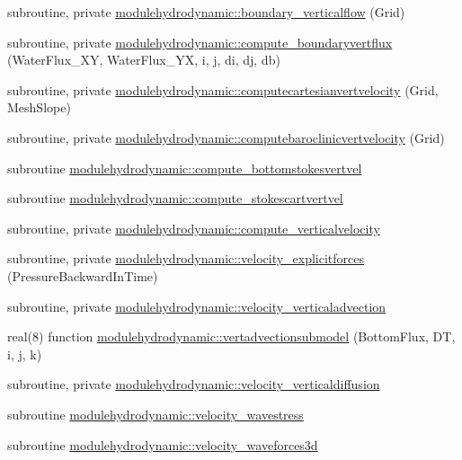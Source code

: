 \begin{DoxyCompactItemize}
subroutine, private \mbox{\hyperlink{namespacemodulehydrodynamic_a08186b721c96e023d8a58a34dc22522f}{modulehydrodynamic\+::boundary\+\_\+verticalflow}} (Grid)
\item 
subroutine, private \mbox{\hyperlink{namespacemodulehydrodynamic_a6bae766b43109e13a0a6976d688327fe}{modulehydrodynamic\+::compute\+\_\+boundaryvertflux}} (Water\+Flux\+\_\+\+XY, Water\+Flux\+\_\+\+YX, i, j, di, dj, db)
\item 
subroutine, private \mbox{\hyperlink{namespacemodulehydrodynamic_a6063cff17a8575e5ea95e38e9a14da2d}{modulehydrodynamic\+::computecartesianvertvelocity}} (Grid, Mesh\+Slope)
\item 
subroutine, private \mbox{\hyperlink{namespacemodulehydrodynamic_a1d49415947b89ef0be84e9bdfbad90a0}{modulehydrodynamic\+::computebaroclinicvertvelocity}} (Grid)
\item 
subroutine \mbox{\hyperlink{namespacemodulehydrodynamic_a7cd2ef8de29d245b1298263b1facaaea}{modulehydrodynamic\+::compute\+\_\+bottomstokesvertvel}}
\item 
subroutine \mbox{\hyperlink{namespacemodulehydrodynamic_abb245df1c1a4f6ca752bd7181e8c61e1}{modulehydrodynamic\+::compute\+\_\+stokescartvertvel}}
\item 
subroutine, private \mbox{\hyperlink{namespacemodulehydrodynamic_aced7b976b91c1f042518042a8b14bad5}{modulehydrodynamic\+::compute\+\_\+verticalvelocity}}
\item 
subroutine, private \mbox{\hyperlink{namespacemodulehydrodynamic_a2789c8c5f9e3e6838c5dda5c13dcd234}{modulehydrodynamic\+::velocity\+\_\+explicitforces}} (Pressure\+Backward\+In\+Time)
\item 
subroutine, private \mbox{\hyperlink{namespacemodulehydrodynamic_ac07b9cc801de5e329ae0bf6d2bc4783b}{modulehydrodynamic\+::velocity\+\_\+verticaladvection}}
\item 
real(8) function \mbox{\hyperlink{namespacemodulehydrodynamic_a514294a37adf9ce3b21a6817c7a86ae1}{modulehydrodynamic\+::vertadvectionsubmodel}} (Bottom\+Flux, DT, i, j, k)
\item 
subroutine, private \mbox{\hyperlink{namespacemodulehydrodynamic_adb227f6b4fa5a958b2dd2061dbfcb22d}{modulehydrodynamic\+::velocity\+\_\+verticaldiffusion}}
\item 
subroutine \mbox{\hyperlink{namespacemodulehydrodynamic_ad5e5fda7c09616794f5a3e2d1a317161}{modulehydrodynamic\+::velocity\+\_\+wavestress}}
\item 
subroutine \mbox{\hyperlink{namespacemodulehydrodynamic_a7cadc35d4f0e4955a2d416039a2a2d18}{modulehydrodynamic\+::velocity\+\_\+waveforces3d}}

\end{DoxyCompactItemize}
